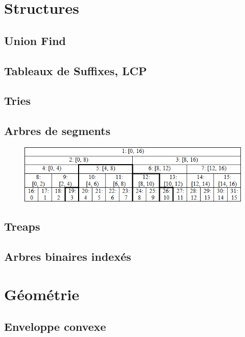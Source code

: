 \documentclass[10pt]{extarticle}
\begin{document}
\section{Structures}
\subsection{Union Find}
{\scriptsize}

\subsection{Tableaux de Suffixes, LCP}
{\scriptsize}

\subsection{Tries}
{\scriptsize}

\subsection{Arbres de segments}
\begin{figure}[h]
  \includegraphics{code/segtree.png}
\end{figure}
{\scriptsize}

\subsection{Treaps}
{\scriptsize}

\subsection{Arbres binaires indexés}
{\scriptsize}


\section{Géométrie}
\subsection{Enveloppe convexe}
{\scriptsize}
\end{document}
